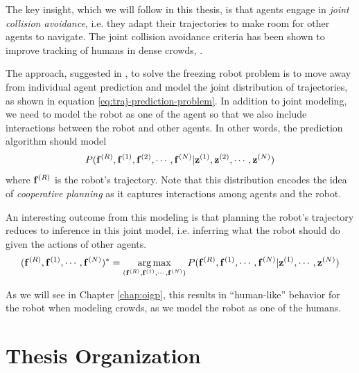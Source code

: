 The key insight, which we will follow in this thesis, is that agents engage in \textit{joint collision avoidance}, i.e. they adapt their trajectories to make room for other agents to navigate. The joint collision avoidance criteria has been shown to improve tracking of humans in dense crowds, \cite{pellegrini09, trautman10, trautman13, trautman15}.

The approach, suggested in \cite{trautman10}, to solve the freezing robot problem is to move away from individual agent prediction and model the joint distribution of trajectories, as shown in equation \ref{eq:traj-prediction-problem}. In addition to joint modeling, we need to model the robot as one of the agent so that we also include interactions between the robot and other agents. In other words, the prediction algorithm should model
\begin{equation}
  \label{eq:freeze}
  P(\mathbf{f}^{(R)}, \mathbf{f}^{(1)}, \mathbf{f}^{(2)}, \cdots, \mathbf{f}^{(N)} | \mathbf{z}^{(1)}, \mathbf{z}^{(2)}, \cdots, \mathbf{z}^{(N)})
\end{equation}
where $\mathbf{f}^{(R)}$ is the robot's trajectory. Note that this distribution encodes the idea of \textit{cooperative planning} as it captures interactions among agents and the robot.

An interesting outcome from this modeling is that planning the robot's trajectory reduces to inference in this joint model, i.e. inferring what the robot should do given the actions of other agents.
\begin{equation}
  \label{eq:planning-reduced-to-inference}
  (\mathbf{f}^{(R)}, \mathbf{f}^{(1)}, \cdots, \mathbf{f}^{(N)})^* = \operatorname*{arg\,max}_{(\mathbf{f}^{(R)}, \mathbf{f}^{(1)}, \cdots, \mathbf{f}^{(N)})} P(\mathbf{f}^{(R)}, \mathbf{f}^{(1)}, \cdots, \mathbf{f}^{(N)} | \mathbf{z}^{(1)}, \cdots, \mathbf{z}^{(N)})
\end{equation}

As we will see in Chapter \ref{chap:oigp}, this results in ``human-like'' behavior for the robot when modeling crowds, as we model the robot as one of the humans. 


\section{Thesis Organization}
\label{sec:intro-thesis-organization}

